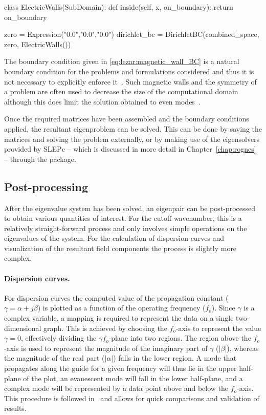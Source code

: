 \begin{python}
class ElectricWalls(SubDomain):
    def inside(self, x, on_boundary):
        return on_boundary

zero = Expression("0.0","0.0","0.0")
dirichlet_bc = DirichletBC(combined_space, zero, ElectricWalls())
\end{python}

The boundary condition given in \eqref{eq:lezar:magnetic_wall_BC}
is a natural boundary condition for the problems and formulations
considered and thus it is not necessary to explicitly enforce
it~\citep{PelosiCoccioliSelleri1998}. Such magnetic walls and the
symmetry of a problem are often used to decrease the size of the
computational domain although this does limit the solution obtained to
even modes~\citep{Jin2002}.

Once the required matrices have been assembled and the boundary conditions
applied, the resultant eigenproblem can be solved. This can be done by
saving the matrices and solving the problem externally, or by making
use of the eigensolvers provided by SLEPc -- which is discussed in more
detail in Chapter~\ref{chap:rognes} -- through the \fenics{} package.

\subsection{Post-processing}

After the eigenvalue system has been solved, an eigenpair can
be post-processed to obtain various quantities of interest. For the
cutoff wavenumber, this is a relatively
straight-forward process and only involves simple operations on the
eigenvalues of the system. For the calculation of dispersion curves
and visualization of the resultant field components the process is
slightly more complex.

\paragraph{Dispersion curves.}

For dispersion curves the computed value of the propagation constant
($\gamma = \alpha + j\beta$) is plotted as a function of the operating
frequency ($f_o$). Since $\gamma$ is a complex variable, a mapping is
required to represent the data on a single two-dimensional graph. This
is achieved by choosing the $f_o$-axis to represent the value $\gamma
= 0$, effectively dividing the {$\gamma{f_o}$}-plane into two
regions. The region above the $f_o$-axis is used to represent the
magnitude of the imaginary part of $\gamma$ ($|\beta|$), whereas the
magnitude of the real part ($|\alpha|$) falls in the lower region. A
mode that propagates along the guide for a given frequency will thus
lie in the upper half-plane of the plot, an evanescent mode will fall
in the lower half-plane, and a complex mode will be represented by a
data point above and below the $f_o$-axis.  This procedure is followed
in~\citet{PelosiCoccioliSelleri1998} and allows for quick comparisons
and validation of results.

